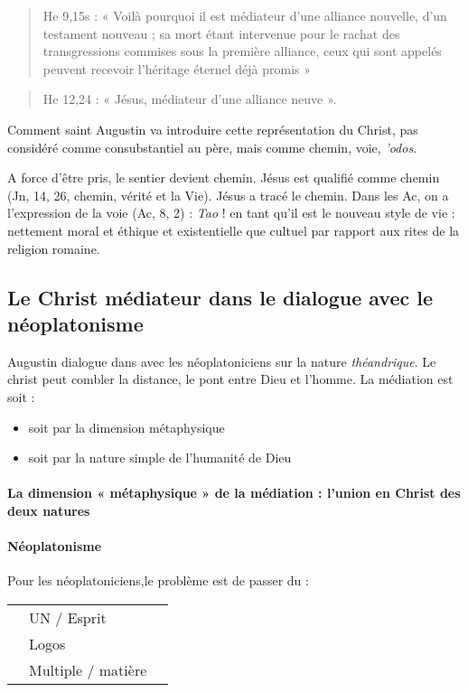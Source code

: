 \begin{quote}
    He 9,15s : « Voilà pourquoi il est médiateur d’une alliance nouvelle, d’un testament nouveau ; sa mort étant intervenue pour le rachat des transgressions commises sous la première alliance, ceux qui sont appelés peuvent recevoir l’héritage éternel déjà promis »  
\end{quote}
\begin{quote}
    He 12,24 : « Jésus, médiateur d’une alliance neuve ». 
\end{quote}

\begin{Synthesis}
Comment saint Augustin va introduire cette représentation du Christ, pas considéré comme consubstantiel au père, mais comme chemin, voie, \textit{'odos}. 
\end{Synthesis}
A force d'être pris, le sentier devient chemin. Jésus est qualifié comme chemin (Jn, 14, 26, chemin, vérité et la Vie). Jésus a tracé le chemin. Dans les Ac, on a l'expression de la voie (Ac, 8, 2) : \textit{Tao} !  en tant qu'il est le nouveau style de vie : nettement moral et éthique et existentielle que cultuel par rapport aux rites de la religion romaine. 

\subsection{Le Christ médiateur dans le dialogue avec le néoplatonisme}

Augustin dialogue dans  \CD avec les néoplatoniciens sur la nature \textit{théandrique}. Le christ peut combler la distance, le pont entre Dieu et l'homme. La médiation est soit : 
\begin{itemize}
    \item soit par la dimension métaphysique
    \item soit par la nature simple de l'humanité de Dieu
\end{itemize}

 \paragraph{La dimension « métaphysique » de la médiation : l’union en Christ des deux natures } 
 
 \paragraph{Néoplatonisme} Pour les néoplatoniciens,le problème est de passer du : 
\begin{table}[h!]
\centering
\begin{tabular}{lll}
 & UN / Esprit        &  \\
 & Logos              &  \\
 & Multiple / matière & 
\end{tabular}
\end{table}

